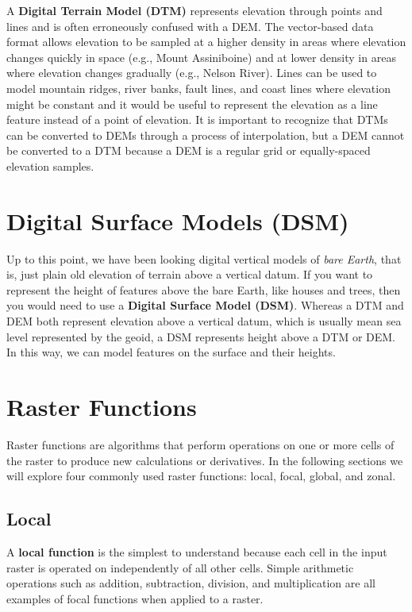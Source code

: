\documentclass[
]{book}
\begin{document}
A \textbf{Digital Terrain Model (DTM)} represents elevation through points and lines and is often erroneously confused with a DEM. The vector-based data format allows elevation to be sampled at a higher density in areas where elevation changes quickly in space (e.g., Mount Assiniboine) and at lower density in areas where elevation changes gradually (e.g., Nelson River). Lines can be used to model mountain ridges, river banks, fault lines, and coast lines where elevation might be constant and it would be useful to represent the elevation as a line feature instead of a point of elevation. It is important to recognize that DTMs can be converted to DEMs through a process of interpolation, but a DEM cannot be converted to a DTM because a DEM is a regular grid or equally-spaced elevation samples.

\section{Digital Surface Models (DSM)}\label{digital-surface-models-dsm}

Up to this point, we have been looking digital vertical models of \emph{bare Earth}, that is, just plain old elevation of terrain above a vertical datum. If you want to represent the height of features above the bare Earth, like houses and trees, then you would need to use a \textbf{Digital Surface Model (DSM)}. Whereas a DTM and DEM both represent elevation above a vertical datum, which is usually mean sea level represented by the geoid, a DSM represents height above a DTM or DEM. In this way, we can model features on the surface and their heights.

\section{Raster Functions}\label{raster-functions}

Raster functions are algorithms that perform operations on one or more cells of the raster to produce new calculations or derivatives. In the following sections we will explore four commonly used raster functions: local, focal, global, and zonal.

\subsection{Local}\label{local}

A \textbf{local function} is the simplest to understand because each cell in the input raster is operated on independently of all other cells. Simple arithmetic operations such as addition, subtraction, division, and multiplication are all examples of focal functions when applied to a raster.
\end{document}
